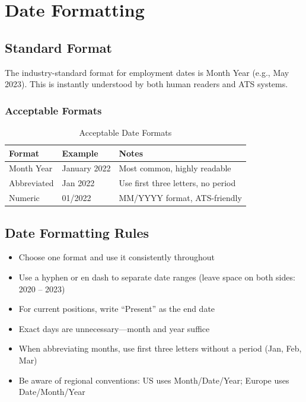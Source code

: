 \documentclass[11pt,a4paper]{article}
\begin{document}
\section{Date Formatting}

\subsection{Standard Format}

\begin{keystat}
The industry-standard format for employment dates is Month Year (e.g., May 2023). This is instantly understood by both human readers and ATS systems.
\end{keystat}

\subsubsection{Acceptable Formats}

\begin{table}[h]
\centering
\begin{tabular}{@{}lll@{}}
\toprule
\textbf{Format} & \textbf{Example} & \textbf{Notes} \\
\midrule
Month Year & January 2022 & Most common, highly readable \\
Abbreviated & Jan 2022 & Use first three letters, no period \\
Numeric & 01/2022 & MM/YYYY format, ATS-friendly \\
\bottomrule
\end{tabular}
\caption{Acceptable Date Formats}
\end{table}

\subsection{Date Formatting Rules}

\begin{bestpractice}
\begin{itemize}[noitemsep]
    \item Choose one format and use it consistently throughout
    \item Use a hyphen or en dash to separate date ranges (leave space on both sides: 2020 -- 2023)
    \item For current positions, write ``Present'' as the end date
    \item Exact days are unnecessary---month and year suffice
    \item When abbreviating months, use first three letters without a period (Jan, Feb, Mar)
    \item Be aware of regional conventions: US uses Month/Date/Year; Europe uses Date/Month/Year
\end{itemize}
\end{bestpractice}
\end{document}
